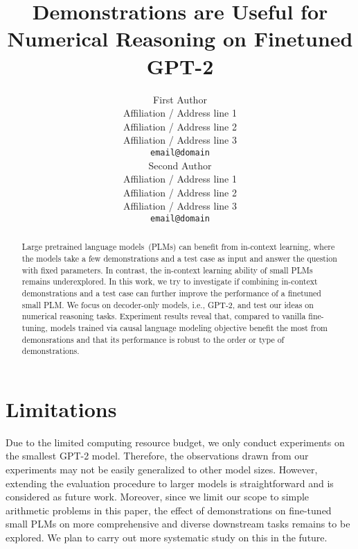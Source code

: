 \documentclass[11pt]{article}
\title{Demonstrations are Useful for Numerical Reasoning on Finetuned GPT-2}
\author{First Author \\
  Affiliation / Address line 1 \\
  Affiliation / Address line 2 \\
  Affiliation / Address line 3 \\
  \texttt{email@domain} \\\And
  Second Author \\
  Affiliation / Address line 1 \\
  Affiliation / Address line 2 \\
  Affiliation / Address line 3 \\
  \texttt{email@domain} \\}
\theoremstyle{definition}
\begin{document}
\maketitle
\begin{abstract}
Large pretrained language models~(PLMs) can benefit from in-context learning, 
where the models take a few demonstrations and a test case as input and 
answer the question with fixed parameters. In contrast, the in-context learning ability of small PLMs remains underexplored.
In this work, we try to investigate if combining in-context demonstrations 
and a test case can further improve the performance of a finetuned small PLM. 
We focus on decoder-only models, i.e., GPT-2,  and test our ideas on numerical reasoning tasks. 
Experiment results reveal that, compared to vanilla fine-tuning, models trained via causal language modeling objective benefit the most from demonsrations and that its 
performance is robust to the order or type of demonstrations.
\end{abstract}









% 




\section*{Limitations}
Due to the limited computing resource budget, we only conduct experiments on the smallest GPT-2 model. Therefore, the observations drawn from our experiments may not be easily generalized to other model sizes. 
However, extending the evaluation procedure to larger models is straightforward and is considered as future work. Moreover, since we limit our scope to simple arithmetic problems in this paper, the effect of demonstrations on fine-tuned small PLMs on more comprehensive and diverse downstream tasks remains to be explored. We plan to carry out more  systematic study on this in the future.

\end{document}
